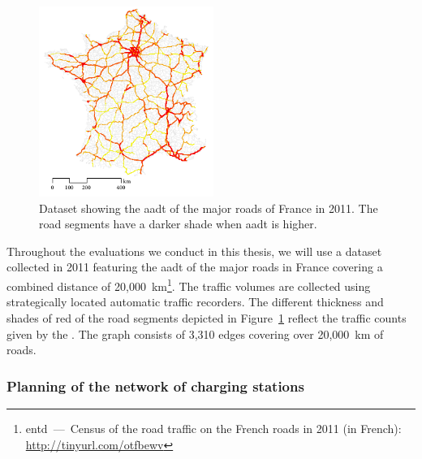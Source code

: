 \begin{figure}
    \includegraphics[width=5.7cm]{figures/france-dataset.pdf}
    \caption{Dataset showing the \acrfull{aadt} of the major roads of France in 2011. The road segments have a darker shade when \acrshort{aadt} is higher.}
    \label{fig:france-dataset}
\end{figure}
Throughout the evaluations we conduct in this thesis, we will use a dataset collected in 2011 featuring the \acrfull{aadt} of the major roads in France covering a combined distance of 20,000~km\footnote{\acrshort{entd}~---~Census of the road traffic on the French roads in 2011 (in French): \url{http://tinyurl.com/otfbewv}}.  The traffic volumes are collected using strategically located automatic traffic recorders. The different thickness and shades of red of the road segments depicted in Figure~\ref{fig:france-dataset} reflect the traffic counts given by the . The graph consists of 3,310 edges covering over 20,000~km of roads. 

\subsubsection{Planning of the network of charging stations}
\label{sec:charging-station-network}

